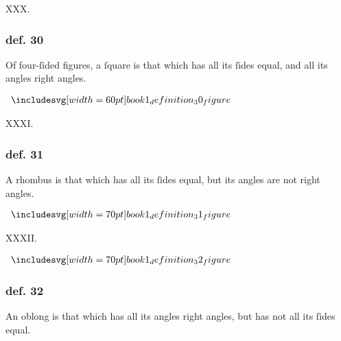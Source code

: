 \hfill

\begin{center}
    XXX.\label{book1def30}\\
\end{center}
\begin{minipage}{0.67\textwidth}
    \subsubsection{def. 30}
    \begin{center}
        \raggedright Of four-ſided figures, a ſquare is that which has all its ſides equal, and all its angles right angles.
    \end{center}
\end{minipage}%
\begin{minipage}{0.33\textwidth}
    \begin{center}
        $\img[0][0][60]{book1_definition_30_figure}$
    \end{center}
\end{minipage}

\hfill

\begin{center}
    XXXI.\label{book1def31}\\
\end{center}
\begin{minipage}{0.67\textwidth}
    \subsubsection{def. 31}
    \begin{center}
        \raggedright A rhombus is that which has all its ſides equal, but its angles are not right angles.
    \end{center}
\end{minipage}%
\begin{minipage}{0.33\textwidth}
    \begin{center}
        $\img[0][0][70]{book1_definition_31_figure}$
    \end{center}
\end{minipage}

\hfill

\begin{center}
    XXXII.\label{book1def32}\\
\end{center}
\begin{minipage}{0.33\textwidth}
    \begin{center}
        $\img[0][0][70]{book1_definition_32_figure}$
    \end{center}
\end{minipage}%
\begin{minipage}{0.67\textwidth}
    \subsubsection{def. 32}
    \begin{center}
        \raggedright An oblong is that which has all its angles right angles, but has not all its ſides equal.
    \end{center}
\end{minipage}

